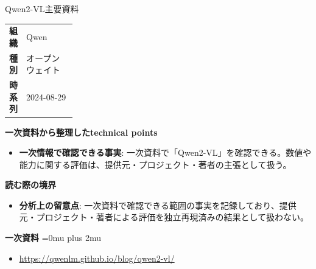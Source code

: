 \begin{technicalnote}{Qwen2-VL}{主要資料}
\begingroup
\begin{tabularx}{\linewidth}{@{}>{\bfseries}p{0.22\linewidth}X@{}}
組織 & Qwen \\
種別 & オープンウェイト \\
時系列 & 2024-08-29 \\
\end{tabularx}
\smallskip
{\bfseries 一次資料から整理したtechnical points}
\begin{itemize}[leftmargin=1.5em,itemsep=0.35em]
\item \textbf{一次情報で確認できる事実}: 一次資料で「Qwen2-VL」を確認できる。数値や能力に関する評価は、提供元・プロジェクト・著者の主張として扱う。
\end{itemize}
\begin{minipage}{\linewidth}
{\bfseries 読む際の境界}
\begin{itemize}[leftmargin=1.5em,itemsep=0.35em]
\item \textbf{分析上の留意点}: 一次資料で確認できる範囲の事実を記録しており、提供元・プロジェクト・著者による評価を独立再現済みの結果として扱わない。
\end{itemize}
\begin{samepage}
{\bfseries 一次資料}
\begingroup\sloppy
\Urlmuskip=0mu plus 2mu\relax
\begin{itemize}[leftmargin=1.5em,itemsep=0.25em]
\item {\scriptsize\url{https://qwenlm.github.io/blog/qwen2-vl/}}
\end{itemize}
\endgroup
\end{samepage}
\end{minipage}
\endgroup
\end{technicalnote}
\medskip

